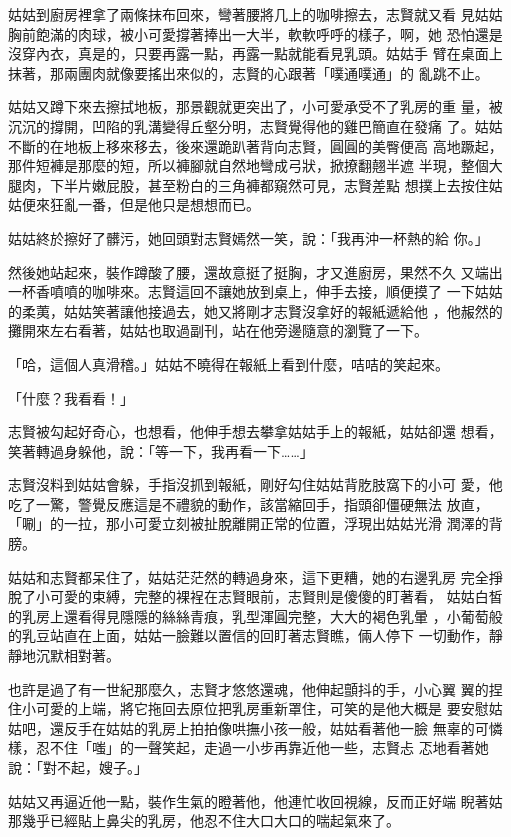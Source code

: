 姑姑到廚房裡拿了兩條抹布回來，彎著腰將几上的咖啡擦去，志賢就又看
見姑姑胸前飽滿的肉球，被小可愛撐著捧出一大半，軟軟呼呼的樣子，啊，她
恐怕還是沒穿內衣，真是的，只要再露一點，再露一點就能看見乳頭。姑姑手
臂在桌面上抹著，那兩團肉就像要搖出來似的，志賢的心跟著「噗通噗通」的
亂跳不止。

姑姑又蹲下來去擦拭地板，那景觀就更突出了，小可愛承受不了乳房的重
量，被沉沉的撐開，凹陷的乳溝變得丘壑分明，志賢覺得他的雞巴簡直在發痛
了。姑姑不斷的在地板上移來移去，後來還跪趴著背向志賢，圓圓的美臀便高
高地蹶起，那件短褲是那麼的短，所以褲腳就自然地彎成弓狀，掀撩翻翹半遮
半現，整個大腿肉，下半片嫩屁股，甚至粉白的三角褲都窺然可見，志賢差點
想撲上去按住姑姑便來狂亂一番，但是他只是想想而已。

姑姑終於擦好了髒污，她回頭對志賢嫣然一笑，說：「我再沖一杯熱的給
你。」

然後她站起來，裝作蹲酸了腰，還故意挺了挺胸，才又進廚房，果然不久
又端出一杯香噴噴的咖啡來。志賢這回不讓她放到桌上，伸手去接，順便摸了
一下姑姑的柔荑，姑姑笑著讓他接過去，她又將剛才志賢沒拿好的報紙遞給他
，他赧然的攤開來左右看著，姑姑也取過副刊，站在他旁邊隨意的瀏覽了一下。

「哈，這個人真滑稽。」姑姑不曉得在報紙上看到什麼，咭咭的笑起來。

「什麼？我看看！」

志賢被勾起好奇心，也想看，他伸手想去攀拿姑姑手上的報紙，姑姑卻還
想看，笑著轉過身躲他，說：「等一下，我再看一下……」

志賢沒料到姑姑會躲，手指沒抓到報紙，剛好勾住姑姑背肐肢窩下的小可
愛，他吃了一驚，警覺反應這是不禮貌的動作，該當縮回手，指頭卻僵硬無法
放直，「唰」的一拉，那小可愛立刻被扯脫離開正常的位置，浮現出姑姑光滑
潤澤的背膀。

姑姑和志賢都呆住了，姑姑茫茫然的轉過身來，這下更糟，她的右邊乳房
完全掙脫了小可愛的束縛，完整的裸裎在志賢眼前，志賢則是傻傻的盯著看，
姑姑白皙的乳房上還看得見隱隱的絲絲青痕，乳型渾圓完整，大大的褐色乳暈
，小葡萄般的乳豆站直在上面，姑姑一臉難以置信的回盯著志賢瞧，倆人停下
一切動作，靜靜地沉默相對著。

也許是過了有一世紀那麼久，志賢才悠悠還魂，他伸起顫抖的手，小心翼
翼的捏住小可愛的上端，將它拖回去原位把乳房重新罩住，可笑的是他大概是
要安慰姑姑吧，還反手在姑姑的乳房上拍拍像哄撫小孩一般，姑姑看著他一臉
無辜的可憐樣，忍不住「嗤」的一聲笑起，走過一小步再靠近他一些，志賢忐
忑地看著她說：「對不起，嫂子。」

姑姑又再逼近他一點，裝作生氣的瞪著他，他連忙收回視線，反而正好端
睨著姑那幾乎已經貼上鼻尖的乳房，他忍不住大口大口的喘起氣來了。

